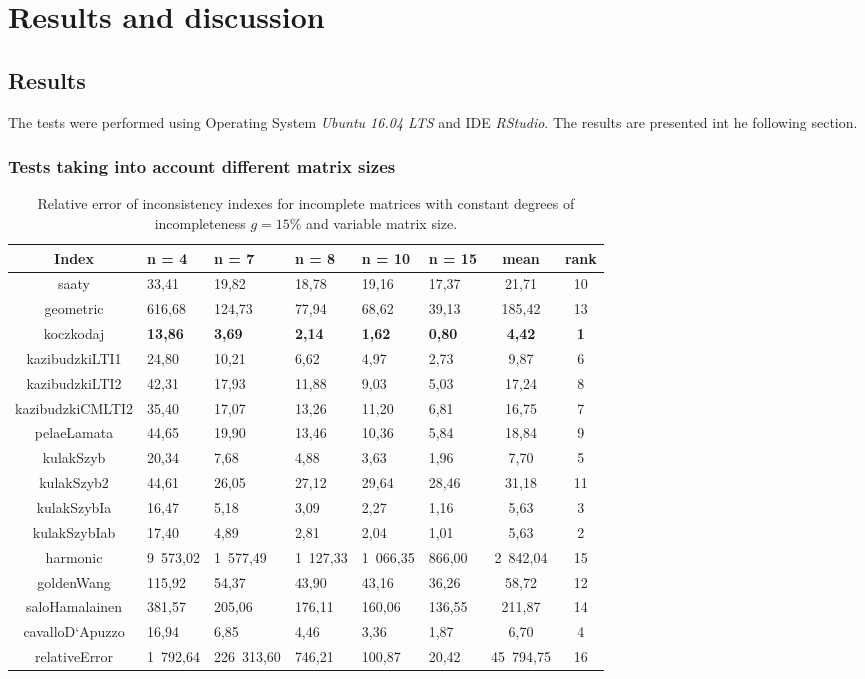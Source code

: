 \chapter{Results and discussion}
\label{sec:results}
\section{Results}
The tests were performed using Operating System \textit{Ubuntu 16.04 LTS} and IDE \textit{RStudio}. The results are presented int he following section.

\subsection{Tests taking into account different matrix sizes}
\begin{table}[h]
\begin{center}
\caption{Relative error of inconsistency indexes for incomplete matrices with constant degrees of incompleteness $g=15\%$ and variable matrix size.}
\label{tab:results1}
\begin{tabular}{|c||l|l|l|l|l|c||c|}
\hline Index & n = 4 & n = 7 & n = 8 & n = 10 & n = 15 & mean & rank \\ \hline \hline
saaty & 33,41 & 19,82 & 18,78 & 19,16 & 17,37 & 21,71 & 10 \\ \hline
geometric & 616,68 & 124,73 & 77,94 & 68,62 & 39,13 & 185,42 & 13 \\ \hline
koczkodaj & \textbf{13,86} & \textbf{3,69} & \textbf{2,14} & \textbf{1,62} & \textbf{0,80} & \textbf{4,42} & \textbf{1} \\ \hline
kazibudzkiLTI1 & 24,80 & 10,21 & 6,62 & 4,97 & 2,73 & 9,87 & 6 \\ \hline
kazibudzkiLTI2 & 42,31 & 17,93 & 11,88 & 9,03 & 5,03 & 17,24 & 8 \\ \hline
kazibudzkiCMLTI2 & 35,40 & 17,07 & 13,26 & 11,20 & 6,81 & 16,75 & 7 \\ \hline
pelaeLamata & 44,65 & 19,90 & 13,46 & 10,36 & 5,84 & 18,84 & 9 \\ \hline
kulakSzyb & 20,34 & 7,68 & 4,88 & 3,63 & 1,96 & 7,70 & 5 \\ \hline
kulakSzyb2 & 44,61 & 26,05 & 27,12 & 29,64 & 28,46 & 31,18 & 11 \\ \hline
kulakSzybIa & 16,47 & 5,18 & 3,09 & 2,27 & 1,16 & 5,63 & 3 \\ \hline
kulakSzybIab & 17,40 & 4,89 & 2,81 & 2,04 & 1,01 & 5,63 & 2 \\ \hline
harmonic & 9 573,02 & 1 577,49 & 1 127,33 & 1 066,35 & 866,00 & 2 842,04 & 15 \\ \hline
goldenWang & 115,92 & 54,37 & 43,90 & 43,16 & 36,26 & 58,72 & 12 \\ \hline
saloHamalainen & 381,57 & 205,06 & 176,11 & 160,06 & 136,55 & 211,87 & 14 \\ \hline
cavalloD`Apuzzo & 16,94 & 6,85 & 4,46 & 3,36 & 1,87 & 6,70 & 4 \\ \hline
relativeError & 1 792,64 & 226 313,60 & 746,21 & 100,87 & 20,42 & 45 794,75 & 16 \\ \hline
\end{tabular}
\end{center}
\end{table}

